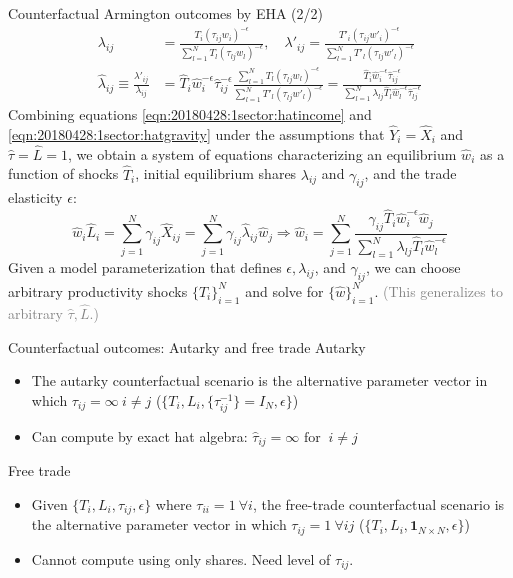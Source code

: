 \documentclass[10pt,notes=hide,aspectratio=169]{beamer}
\begin{document}
\begin{frame}{Counterfactual Armington outcomes by EHA (2/2)}
\begin{align}
\lambda_{ij} 
&=
\frac{T_{i} \left(\tau_{ij}w_i\right)^{-\epsilon}}{\sum_{l=1}^{N} T_{l}  \left(\tau_{lj}w_l\right)^{-\epsilon}},
\quad
\lambda'_{ij} 
=
\frac{T'_{i} \left(\tau_{ij}w'_i\right)^{-\epsilon}}{\sum_{l=1}^{N} T'_{l}  \left(\tau_{lj}w'_l\right)^{-\epsilon}}
\nonumber \\
\hat{\lambda}_{ij}
\equiv 
\frac{\lambda'_{ij}}{\lambda_{ij}}
&=
\hat{T}_{i} \hat{w}_{i}^{-\epsilon} \hat{\tau}_{ij}^{-\epsilon}
\frac{\sum_{l=1}^{N} T_{l}  \left(\tau_{lj}w_l \right)^{-\epsilon}}
	 {\sum_{l=1}^{N} T'_{l} \left(\tau_{lj}w'_l\right)^{-\epsilon}}
=
\frac{\hat{T}_{i} \hat{w}_{i}^{-\epsilon}\hat{\tau}_{ij}^{-\epsilon}}{\sum_{l=1}^{N} \lambda_{lj} \hat{T}_{l} \hat{w}_l^{-\epsilon} \hat{\tau}_{lj}^{-\epsilon}}
\label{eqn:20180428:1sector:hatgravity}
\end{align}
Combining equations \eqref{eqn:20180428:1sector:hatincome} and \eqref{eqn:20180428:1sector:hatgravity}
under the assumptions that $\hat{Y}_{i}=\hat{X}_{i}$ and $\hat{\tau}=\hat{L}=1$, we
obtain a system of equations characterizing an equilibrium $\hat{w}_i$ as a
function of shocks $\hat{T}_i$, initial equilibrium shares $\lambda_{ij}$ and
$\gamma_{ij}$, and the trade elasticity $\epsilon$:
\begin{equation}
\hat{w}_i \hat{L}_i
= 
\sum_{j=1}^{N} \gamma_{ij} \hat{X}_{ij}
=
\sum_{j=1}^{N} \gamma_{ij} \hat{\lambda}_{ij} \hat{w}_{j}
\nonumber 
\Rightarrow
\hat{w}_i
= 
\sum_{j=1}^{N}
\frac{\gamma_{ij} \hat{T}_{i} \hat{w}_{i}^{-\epsilon} \hat{w}_{j} }
{\sum_{l=1}^{N} \lambda_{lj} \hat{T}_{l} \hat{w}_l^{-\epsilon}}
\label{eqn:20180428:1sector:hatequilibriumequations}
\end{equation}
Given a model parameterization that defines $\epsilon, \lambda_{ij}$, and $\gamma_{ij}$,
we can choose arbitrary productivity shocks $\{\hat{T}_{i}\}_{i=1}^{N}$ and solve for $\{\hat{w}\}_{i=1}^{N}$.
\textcolor{gray}{(This generalizes to arbitrary $\hat{\tau},\hat{L}$.)}
\end{frame}
\begin{frame}{Counterfactual outcomes: Autarky and free trade}
Autarky
\begin{itemize}
\item The autarky counterfactual scenario is the alternative parameter vector
in which $\tau_{ij} = \infty \ i \neq j$
($\{T_i,L_i,\{\tau_{ij}^{-1}\}=I_N,\epsilon\}$)
\item Can compute by exact hat algebra: $\hat{\tau}_{ij} = \infty \text{ for } \ i \neq j$
\end{itemize}
Free trade
\begin{itemize}
\item Given $\{T_i,L_i,\tau_{ij},\epsilon\}$ where $\tau_{ii} = 1 \ \forall i$,
the free-trade counterfactual scenario is the alternative parameter vector
in which $\tau_{ij} = 1 \ \forall ij$
($\{T_i,L_i,\mathbf{1}_{N \times N},\epsilon\}$)
\item Cannot compute using only shares. Need level of $\tau_{ij}$.
\end{itemize}
\end{frame}
\end{document}
